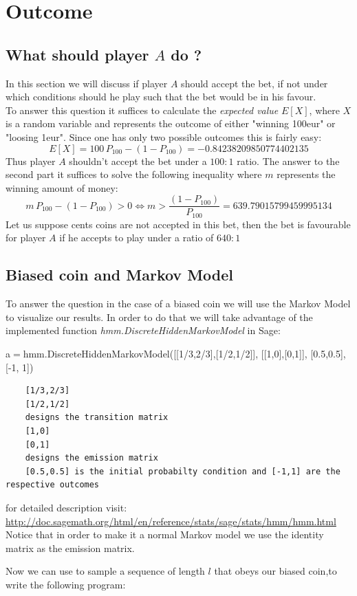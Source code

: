 \documentclass[a4paper,13pt,oneside]{article}
\theoremstyle{remark}
\begin{document}
\section{Outcome}
\subsection{What should player $A$ do ?}
In this section we will discuss if player $A$ should accept the bet, if not under which conditions should  he play such that the bet would be in his favour.\\
To answer this question it suffices to calculate the \textit{expected value} $E[X]$, where $X$ is a random variable and represents the outcome of  either "winning 100eur" or "loosing 1eur". Since one has only two possible outcomes this is fairly easy:
\[
E[X]= 100 \,P_{100} -(1-P_{100}) = -0.84238209850774402135
\] 
Thus player $A$ shouldn't accept the bet under a $100:1$ ratio.
\bigskip
The answer to the second part it suffices to solve the following  inequality where $m$ represents the winning amount of money:
\[
m \,P_{100} -(1-P_{100}) > 0 \iff m > \frac{(1-P_{100})}{P_{100}} = 639.79015799459995134
\]
Let us suppose cents coins are not accepted in this bet, then
the bet is favourable for player $A$ if he accepts to play under a ratio of $640:1$
 
\subsection{Biased coin and Markov Model}
To answer the question in the case of a biased coin we will use the Markov Model to visualize our results.
In order to do that we will take advantage of the implemented function \textit{hmm.DiscreteHiddenMarkovModel} in Sage:\\
\begin{flushleft}

a$=$hmm.DiscreteHiddenMarkovModel([[1/3,2/3],[1/2,1/2]], [[1,0],[0,1]],  [0.5,0.5],[-1, 1])\\
\begin{verbatim}
	[1/3,2/3]
	[1/2,1/2]
	designs the transition matrix
	[1,0]
	[0,1]
	designs the emission matrix
	[0.5,0.5] is the initial probabilty condition and [-1,1] are the respective outcomes

\end{verbatim}
for detailed description visit: \url{http://doc.sagemath.org/html/en/reference/stats/sage/stats/hmm/hmm.html}\\
Notice that in order to make it a normal Markov model we use the identity matrix as the emission matrix.

\end{flushleft}
Now we can use  to sample a sequence of length $l$ that obeys our biased coin,to write the following program: \\ 
\end{document}

